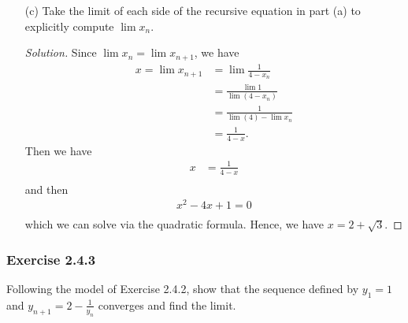 \begin{enumerate}
        \begin{proof}[Solution]
            Since \( (x_n) \) is \textit{monotone} and \textit{bounded}, then \( (x_{n+1})\) is also \textit{monotone} and \textit{bounded}. By the Monotone Convergence Theorem, we have that \( (x_{n+1})\) is also convergent. Hence, \( \lim x_{n+1}\) also exists.    
        \end{proof}
    \item[(c)] Take the limit of each side of the recursive equation in part (a) to explicitly compute \( \lim x_n \). 
        \begin{proof}[Solution]
            Since \( \lim x_n = \lim x_{n+1}\), we have
            \begin{align*}
                x = \lim x_{n+1} &= \lim \frac{1}{4-x_n}  \\ 
                                 &= \frac{ \lim 1 }{ \lim (4 - x_n ) } \\ 
                                 &= \frac{1}{ \lim (4) - \lim x_n} \\
                                 &= \frac{1}{4 - x} \tag{ \( \lim x_n = x \)}.
            \end{align*}
            Then we have 
            \begin{align*}
                x &= \frac{1}{4-x} \\
            \end{align*}
            and then 
            \begin{align*}
                x^2 - 4x + 1 = 0 \\ 
            \end{align*}
            which we can solve via the quadratic formula. Hence, we have \( x = 2 + \sqrt{3}\). 
        \end{proof}

\end{enumerate}

\subsubsection{Exercise 2.4.3}
Following the model of Exercise 2.4.2, show that the sequence defined by \( y_1 = 1 \) and \( y_{n+1} = 2 - \frac{1}{y_n}\) converges and find the limit.

